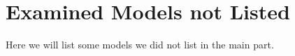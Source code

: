 \chapter{Examined Models not Listed}
\label{chap:app.models}

Here we will list some models we did not list in the main part.




